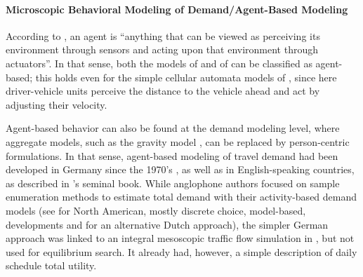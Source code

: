 \paragraph{Microscopic Behavioral Modeling of Demand/Agent-Based Modeling} 
According to \citet[][p.~53]{RusselNorvig2010ArtificialIntelligence}, an \gls{agent} is ``anything that can be viewed as perceiving its environment through sensors and acting upon that environment through actuators''. In that sense, both the models of \citet{Seddon_Simulation_1972} and of \citet{Wiedemann_PhDThesis_1974} can be classified as agent-based; this holds even for the simple cellular automata models of \citet{NagelSchreckenberg1992CA}, since here driver-vehicle units perceive the distance to the vehicle ahead and act by adjusting their velocity.  

Agent-based behavior can also be found at the demand modeling level, where aggregate models, such as the gravity model \citep{Wilson1971SpatialInteraction}, can be replaced by person-centric formulations. In that sense, agent-based modeling of travel demand had been developed in Germany since the 1970's \citep[see the references in][]{AxhausenHerz_JTE_1989}, as well as in English-speaking countries, as described in \citet[][]{JonesEtAl_1983}'s seminal book.  
%
%
While anglophone authors focused on sample enumeration methods to estimate total demand with their 
activity-based demand models (see \citet[][]{BradleyBowman_TRBTDF_2006} for North American, mostly discrete choice, model-based, developments and \citet[][]{ArentzeTimmermans_2000} for an alternative Dutch approach), the simpler German approach was linked to an integral mesoscopic traffic flow simulation in \citet[][]{Axhausen_TechRep_IFV_1989}, but not used for equilibrium search. It already had, however, a simple description of daily schedule total utility.


